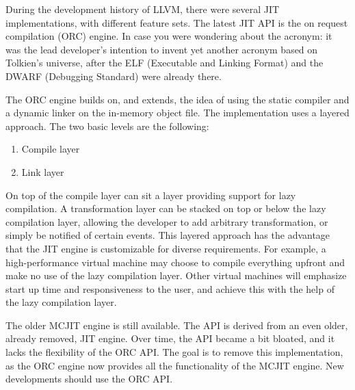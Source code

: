 During the development history of LLVM, there were several JIT implementations, with different feature sets. The latest JIT API is the on request compilation (ORC) engine. In case you were wondering about the acronym: it was the lead developer's intention to invent yet another acronym based on Tolkien's universe, after the ELF (Executable and Linking Format) and the DWARF (Debugging Standard) were already there.\par

The ORC engine builds on, and extends, the idea of using the static compiler and a dynamic linker on the in-memory object file. The implementation uses a layered approach. The two basic levels are the following:\par

\begin{enumerate}
\item Compile layer 
\item Link layer
\end{enumerate}

On top of the compile layer can sit a layer providing support for lazy compilation. A transformation layer can be stacked on top or below the lazy compilation layer, allowing the developer to add arbitrary transformation, or simply be notified of certain events. This layered approach has the advantage that the JIT engine is customizable for diverse requirements. For example, a high-performance virtual machine may choose to compile everything upfront and make no use of the lazy compilation layer. Other virtual machines will emphasize start up time and responsiveness to the user, and achieve this with the help of the lazy compilation layer.\par

The older MCJIT engine is still available. The API is derived from an even older, already removed, JIT engine. Over time, the API became a bit bloated, and it lacks the flexibility of the ORC API. The goal is to remove this implementation, as the ORC engine now provides all the functionality of the MCJIT engine. New developments should use the ORC API.\par

